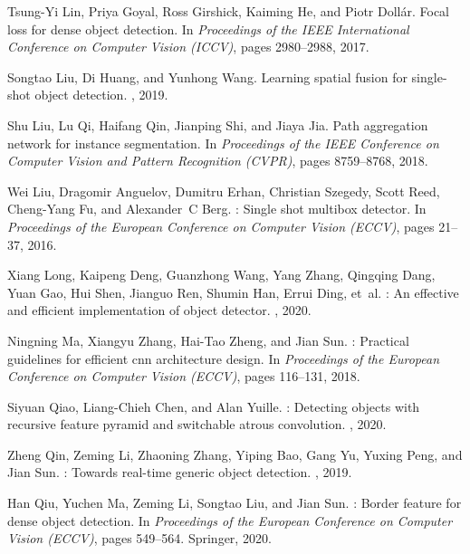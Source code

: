 \documentclass[10pt,twocolumn,letterpaper]{article}
\begin{document}
{\begin{thebibliography}{10}
	Tsung-Yi Lin, Priya Goyal, Ross Girshick, Kaiming He, and Piotr Doll{\'a}r.
	\newblock Focal loss for dense object detection.
	\newblock In {\em Proceedings of the IEEE International Conference on Computer
		Vision (ICCV)}, pages 2980--2988, 2017.
	
	Songtao Liu, Di Huang, and Yunhong Wang.
	\newblock Learning spatial fusion for single-shot object detection.
	, 2019.
	
	Shu Liu, Lu Qi, Haifang Qin, Jianping Shi, and Jiaya Jia.
	\newblock Path aggregation network for instance segmentation.
	\newblock In {\em Proceedings of the IEEE Conference on Computer Vision and
		Pattern Recognition (CVPR)}, pages 8759--8768, 2018.
	
	Wei Liu, Dragomir Anguelov, Dumitru Erhan, Christian Szegedy, Scott Reed,
	Cheng-Yang Fu, and Alexander~C Berg.
	: Single shot multibox detector.
	\newblock In {\em Proceedings of the European Conference on Computer Vision
		(ECCV)}, pages 21--37, 2016.
	
	Xiang Long, Kaipeng Deng, Guanzhong Wang, Yang Zhang, Qingqing Dang, Yuan Gao,
	Hui Shen, Jianguo Ren, Shumin Han, Errui Ding, et~al.
	: An effective and efficient implementation of object
	detector.
	, 2020.
	
	Ningning Ma, Xiangyu Zhang, Hai-Tao Zheng, and Jian Sun.
	: Practical guidelines for efficient cnn architecture
	design.
	\newblock In {\em Proceedings of the European Conference on Computer Vision
		(ECCV)}, pages 116--131, 2018.
	
	Siyuan Qiao, Liang-Chieh Chen, and Alan Yuille.
	: Detecting objects with recursive feature pyramid and
	switchable atrous convolution.
	, 2020.
	
	Zheng Qin, Zeming Li, Zhaoning Zhang, Yiping Bao, Gang Yu, Yuxing Peng, and
	Jian Sun.
	: Towards real-time generic object detection.
	, 2019.
	
	Han Qiu, Yuchen Ma, Zeming Li, Songtao Liu, and Jian Sun.
	: Border feature for dense object detection.
	\newblock In {\em Proceedings of the European Conference on Computer Vision
		(ECCV)}, pages 549--564. Springer, 2020.
	

\end{thebibliography}}
\end{document}
